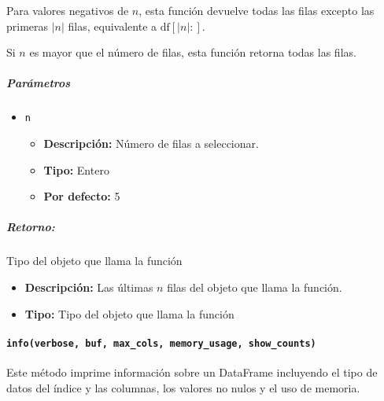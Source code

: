 Para valores negativos de \( n \), esta función devuelve todas las filas
excepto las primeras \( |n| \) filas, equivalente a \( \text{df}[|n|:] \).

Si \( n \) es mayor que el número de filas, esta función retorna todas las
filas.

\subparagraph{\textbf{Parámetros}}
\begin{itemize}
    \item \texttt{n}
          \begin{itemize}
              \item \textbf{Descripción:} Número de filas a seleccionar.
              \item \textbf{Tipo:} Entero
              \item \textbf{Por defecto:} 5
          \end{itemize}
\end{itemize}

\subparagraph{Retorno:} Tipo del objeto que llama la función
\begin{itemize}
    \item \textbf{Descripción:} Las últimas \( n \) filas del objeto que llama
          la función.
    \item \textbf{Tipo:} Tipo del objeto que llama la función
\end{itemize}

\paragraph{\texttt{info(verbose, buf, max\_cols, memory\_usage, show\_counts)}}
Este método imprime información sobre un DataFrame incluyendo el tipo de datos
del índice y las columnas, los valores no nulos y el uso de memoria.

